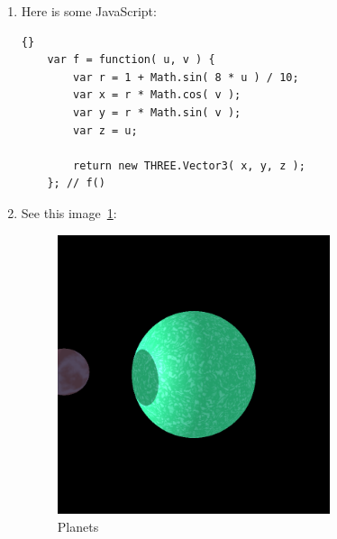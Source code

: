 \documentclass[oneside]{article}
\begin{document}
\begin{enumerate}
  \item Here is some JavaScript:

  \begin{lstlisting}{}
    var f = function( u, v ) {
        var r = 1 + Math.sin( 8 * u ) / 10;
        var x = r * Math.cos( v );
        var y = r * Math.sin( v );
        var z = u;

        return new THREE.Vector3( x, y, z );
    }; // f()
    \end{lstlisting}

  \item See this image~\ref{planets}:

  \begin{figure}
  \begin{center}
    \includegraphics[width=8cm]{planets}
    \end{center}
    \caption{Planets}
    \label{planets}
    \end{figure}

  \end{enumerate}
\end{document}
